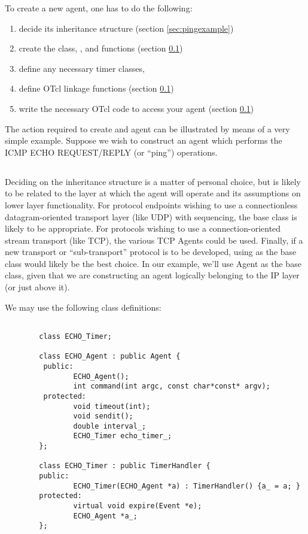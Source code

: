 To create a new agent, one has to do the following:
\begin{enumerate}
        \item decide its inheritance structure (section \ref{sec:pingexample})
        \item create the class, , and  functions (section \ref{})
		\item define any necessary timer classes,
        \item define OTcl linkage functions (section \ref{})
        \item write the necessary OTcl code to access your agent (section \ref{})
\end{enumerate}

The action required to create and agent can be illustrated
by means of a very simple example.
Suppose we wish to construct an agent which performs
the ICMP ECHO REQUEST/REPLY (or ``ping'') operations.

\subsection{}

Deciding on the inheritance structure is a matter of personal choice, but is
likely to be related to the layer at which the agent will operate
and its assumptions on lower layer functionality.
For protocol endpoints wishing to use a connectionless
datagram-oriented transport layer (like UDP) with sequencing,
the  base class is likely to be appropriate.
For protocols wishing to use a connection-oriented stream transport
(like TCP), the various TCP Agents could be used.
Finally, if a new transport or ``sub-transport'' protocol
is to be developed, using 
as the base class would likely be the best choice.
In our example, we'll use Agent as the base class, given that
we are constructing an agent logically belonging to the IP layer
(or just above it).

We may use the following class definitions:
\begin{small}
\begin{verbatim}
	
        class ECHO_Timer;
 
        class ECHO_Agent : public Agent {
         public:
                ECHO_Agent();
                int command(int argc, const char*const* argv);
         protected:
                void timeout(int);
                void sendit();
                double interval_;
                ECHO_Timer echo_timer_;
        };

        class ECHO_Timer : public TimerHandler {
        public:
                ECHO_Timer(ECHO_Agent *a) : TimerHandler() {a_ = a; }
        protected:
                virtual void expire(Event *e);
                ECHO_Agent *a_;
        }; 
\end{verbatim}
\end{small}

